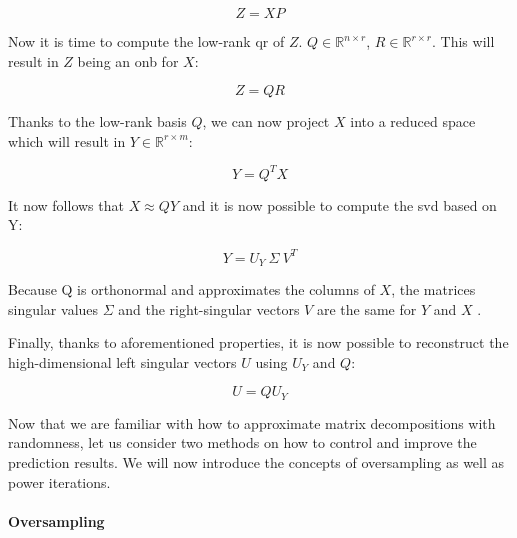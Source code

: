 \vspace{-4mm}
\begin{equation}
	\label{formula:rSVDstepONE}
	Z = X P
\end{equation}

Now it is time to compute the low-rank \gls{qr} of $Z$.
$Q \in \mathbb{R}^{n \times r}$, $R \in \mathbb{R}^{r \times r}$. 
This will result in $Z$ being an \gls{onb} for $X$:

\vspace{-4mm}
\begin{equation}
	\label{formula:rSVDstepTWO}
	Z = Q R
\end{equation}

Thanks to the low-rank basis $Q$, we can now project $X$ into a reduced space which will result in $Y \in \mathbb{R}^{r \times m}$:

\vspace{-4mm}
\begin{equation}
	\label{formula:rSVDstepTHREE}
	Y = Q^T X
\end{equation}

It now follows that $X \approx QY$ \cite{brunton2019data} and it is now possible to compute the \gls{svd} based on Y:

\vspace{-4mm}
\begin{equation}
	\label{formula:rSVDstepFOUR}
	Y = U_Y \ \Sigma \ V^T
\end{equation}

Because Q is orthonormal and approximates the columns of $X$, the matrices singular values $\Sigma$ and the right-singular vectors $V$ are the same for $Y$ and $X$ \cite{brunton2019data}.

\clearpage


Finally, thanks to aforementioned properties, it is now possible to reconstruct the high-dimensional left singular vectors $U$ using $U_Y$ and $Q$:

\vspace{-4mm}
\begin{equation}
	\label{formula:rSVDstepFIVE}
	U = Q U_Y
\end{equation}
\smallskip


Now that we are familiar with how to approximate matrix decompositions with randomness, let us consider two methods on how to control and improve the prediction results.
We will now introduce the concepts of oversampling as well as power iterations.

\paragraph{Oversampling}

